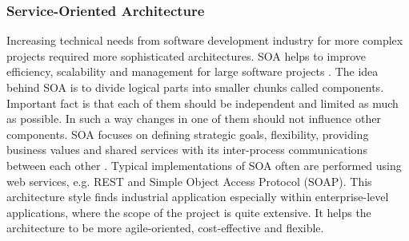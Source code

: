 \documentclass{article} %
\begin{document}
\subsubsection{Service-Oriented Architecture}
Increasing technical needs from software development industry for more complex projects required more sophisticated architectures. SOA helps to improve efficiency, scalability and management for large software projects \cite{bib:ibm_soa}. The idea behind SOA is to divide logical parts into smaller chunks called components. Important fact is that each of them should be independent and limited as much as possible. In such a way changes in one of them should not influence other components. SOA focuses on defining strategic goals, flexibility, providing business values and shared services with its inter-process communications between each other \cite{bib:soa_flexibility}. Typical implementations of SOA often are performed using web services, e.g. REST and Simple Object Access Protocol (SOAP). This architecture style finds industrial application especially within enterprise-level applications, where the scope of the project is quite extensive. It helps the architecture to be more agile-oriented, cost-effective and flexible.
\end{document}

